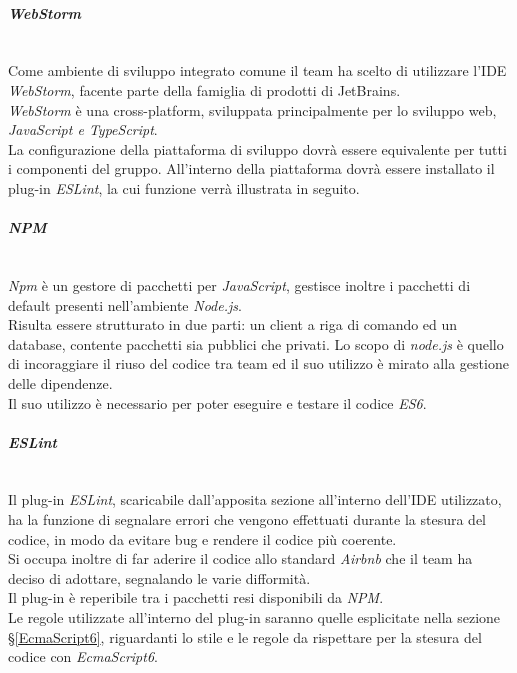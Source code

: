 \paragraph{\textit{WebStorm}}\-\\
Come ambiente di sviluppo integrato comune il team ha scelto di utilizzare l'IDE \textit{WebStorm}, facente parte della famiglia di prodotti di JetBrains. \\
\textit{WebStorm} è una cross-platform, sviluppata principalmente per lo sviluppo web, \textit{JavaScript e TypeScript}. \\
La configurazione della piattaforma di sviluppo dovrà essere equivalente per tutti i componenti del gruppo. All'interno della piattaforma dovrà essere installato il plug-in \textit{ESLint}, la cui funzione verrà illustrata in seguito.

\paragraph{\textit{NPM}}\label{NPM} \-\\
\textit{Npm} è un gestore di pacchetti per \textit{JavaScript}, gestisce inoltre i pacchetti di default presenti nell'ambiente \textit{Node.js}\glossario.\\
Risulta essere strutturato in due parti: un client a riga di comando ed un database, contente pacchetti sia pubblici che privati. Lo scopo di \textit{node.js} è quello di incoraggiare il riuso del codice tra team ed il suo utilizzo è mirato alla gestione delle dipendenze.\\ 
Il suo utilizzo è necessario per poter eseguire e testare il codice \textit{ES6}.

\paragraph{\textit{ESLint}}\-\\
Il plug-in \textit{ESLint}, scaricabile dall'apposita sezione all'interno dell'IDE utilizzato, ha la funzione di segnalare errori che vengono effettuati durante la stesura del codice, in modo da evitare bug e rendere il codice più coerente. \\ 
Si occupa inoltre di far aderire il codice allo standard \textit{Airbnb} che il team ha deciso di adottare, segnalando le varie difformità.\\
Il plug-in è reperibile tra i pacchetti resi disponibili da \textit{NPM}.\\
Le regole utilizzate all'interno del plug-in saranno quelle esplicitate nella sezione §\ref{EcmaScript6}, riguardanti lo stile e le regole da rispettare per la stesura del codice con \textit{EcmaScript6}.


